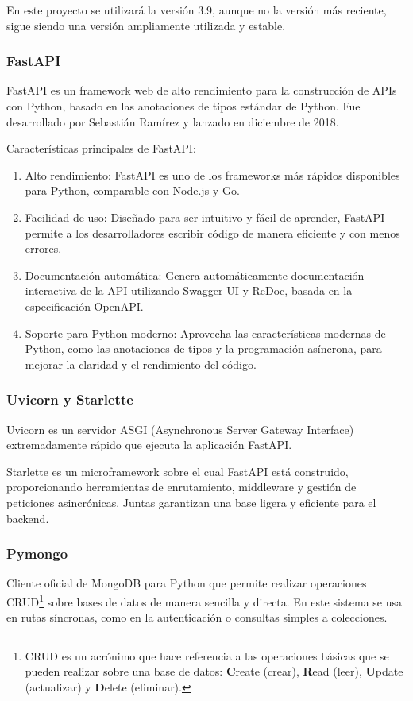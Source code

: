 En este proyecto se utilizará la versión 3.9, aunque no la versión más reciente, sigue siendo una versión
ampliamente utilizada y estable.

\subsubsection*{FastAPI\cite{fastapiDocs}}
FastAPI es un framework web de alto rendimiento para la construcción de APIs con Python, basado en las anotaciones de tipos estándar de Python. Fue desarrollado por Sebastián Ramírez y lanzado en diciembre de 2018. 

Características principales de FastAPI:
\begin{enumerate}
    \item Alto rendimiento: FastAPI es uno de los frameworks más rápidos disponibles para Python, comparable con Node.js y Go. 
    \item Facilidad de uso: Diseñado para ser intuitivo y fácil de aprender, FastAPI permite a los desarrolladores escribir código de manera eficiente y con menos errores. 
    \item Documentación automática: Genera automáticamente documentación interactiva de la API utilizando Swagger UI y ReDoc, basada en la especificación OpenAPI. 
    \item Soporte para Python moderno: Aprovecha las características modernas de Python, como las anotaciones de tipos y la programación asíncrona, para mejorar la claridad y el rendimiento del código.
\end{enumerate}

\subsubsection*{Uvicorn y Starlette}
Uvicorn\cite{uvicorn} es un servidor ASGI (Asynchronous Server Gateway Interface) extremadamente rápido que ejecuta la aplicación FastAPI. 

Starlette\cite{starlette} es un microframework sobre el cual FastAPI está construido, proporcionando herramientas de enrutamiento, middleware y gestión de peticiones asincrónicas. Juntas garantizan una base ligera y eficiente para el backend.

\subsubsection*{Pymongo\cite{pymongo}}
Cliente oficial de MongoDB para Python que permite realizar operaciones CRUD\footnote{CRUD es un acrónimo que hace referencia a las operaciones básicas que se pueden realizar sobre una base de datos: \textbf{C}reate (crear), \textbf{R}ead (leer), \textbf{U}pdate (actualizar) y \textbf{D}elete (eliminar).} sobre bases de datos de manera sencilla y directa. En este sistema se usa en rutas síncronas, como en la autenticación o consultas simples a colecciones.

